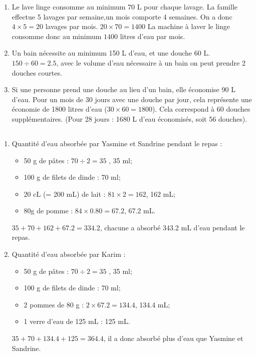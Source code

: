\documentclass[12pt,a4paper]{article}
\begin{document}
\begin{enumerate}
	\item  Le lave linge consomme au minimum 70 L pour chaque lavage. La famille effectue 5 lavages par semaine,un mois comporte 4 semaines. On a donc $4 \times 5 = 20$ lavages par mois. $20 \times 70 =\num{ 1400}$ La machine à laver le linge consomme donc au minimum $\num{1400}$ litres d'eau par mois.
	
	\item Un bain nécessite au minimum 150 L d'eau, et une douche 60 L. $150 \div 60 = \num{2.5}$, avec le volume d'eau nécessaire à un bain on peut prendre 2 douches courtes.
	
	\item Si une personne prend une douche au lieu d'un bain, elle économise 90 L d'eau. Pour un mois de 30 jours avec une douche par jour, cela représente une économie de \num{1800} litres d'eau ($30 \times 60 = \num{1800}$). Cela correspond à 60 douches supplémentaires. (Pour 28 jours : 1680 L d'eau économisés, soit 56 douches).
\end{enumerate}

\subsection*{}
\begin{enumerate}[label=\alph*)]
	\item Quantité d'eau absorbée par Yasmine et Sandrine pendant le repas :
		\begin{itemize}
			\item 50 g de pâtes : $70 \div 2 = 35$ , 35 ml;
			\item 100 g de filets de dinde : 70 ml;
			\item 20 cL (= 200 mL) de lait : $81 \times 2 = 162$, 162 mL;
			\item 80g de pomme : $84 \times \num{0.80} = \num{67.2}$, \num{67,2} mL.
		\end{itemize}
		$35 + 70 + 162 + \num{67.2} = \num{334,2}$, chacune a absorbé \num{343.2} mL d'eau pendant le repas.
	
	
	\item Quantité d'eau absorbée par Karim :
		
		\begin{itemize}
			\item 50 g de pâtes : $70 \div 2 = 35$ , 35 ml;
			\item 100 g de filets de dinde : 70 ml;
			\item 2 pommes de 80 g : $2 \times \num{67.2} = \num{134.4}$, \num{134.4} mL;
			\item 1 verre d'eau de 125 mL : 125 mL.
		\end{itemize}
		$35 + 70 + \num{134.4} + 125 = \num{364,4}$, il a donc absorbé plus d'eau que Yasmine et Sandrine.
\end{enumerate}
\end{document}
